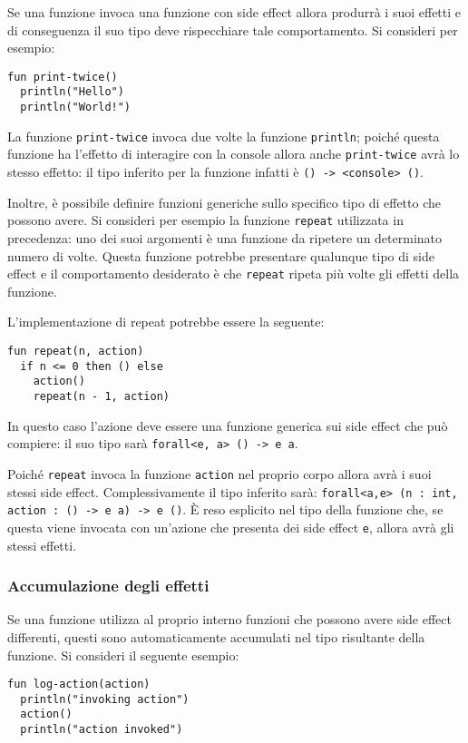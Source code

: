 Se una funzione invoca una funzione con side effect allora produrrà i suoi effetti e di conseguenza il suo tipo deve rispecchiare tale comportamento. Si consideri per esempio:
\begin{lstlisting}[language=koka]
fun print-twice()
  println("Hello")
  println("World!")
\end{lstlisting}
La funzione \lstinline{print-twice} invoca due volte la funzione \lstinline{println}; poiché questa funzione ha l'effetto di interagire con la console allora anche \lstinline{print-twice} avrà lo stesso effetto: il tipo inferito per la funzione infatti è \lstinline{() -> <console> ()}.

Inoltre, è possibile definire funzioni generiche sullo specifico tipo di effetto che possono avere. Si consideri per esempio la funzione \lstinline{repeat} utilizzata in precedenza: uno dei suoi argomenti è una funzione da ripetere un determinato numero di volte.
Questa funzione potrebbe presentare qualunque tipo di side effect e il comportamento desiderato è che \lstinline{repeat} ripeta più volte gli effetti della funzione.

L'implementazione di repeat potrebbe essere la seguente:
\begin{lstlisting}[language=koka]
fun repeat(n, action)
  if n <= 0 then () else
    action()
    repeat(n - 1, action)
\end{lstlisting}
In questo caso l'azione deve essere una funzione generica sui side effect che può compiere: il suo tipo sarà \lstinline{forall<e, a> () -> e a}.

Poiché \lstinline{repeat} invoca la funzione \lstinline{action} nel proprio corpo allora avrà i suoi stessi side effect. Complessivamente il tipo inferito sarà: \lstinline{forall<a,e> (n : int, action : () -> e a) -> e ()}. È reso esplicito nel tipo della funzione che, se questa viene invocata con un'azione che presenta dei side effect \lstinline{e}, allora avrà gli stessi effetti.

\subsubsection{Accumulazione degli effetti}
Se una funzione utilizza al proprio interno funzioni che possono avere side effect differenti, questi sono automaticamente accumulati nel tipo risultante della funzione. Si consideri il seguente esempio:
\begin{lstlisting}[language=koka]
fun log-action(action)
  println("invoking action")
  action()
  println("action invoked")
\end{lstlisting}

